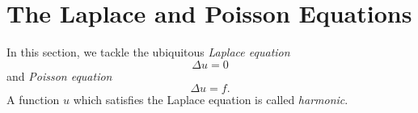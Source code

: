 
\section{The Laplace and Poisson Equations}

In this section, we tackle the ubiquitous \emph{Laplace equation}
\[\Delta u = 0\]
and \emph{Poisson equation}
\[\Delta u = f.\]
A function $u$ which satisfies the Laplace equation is called \emph{harmonic}.

